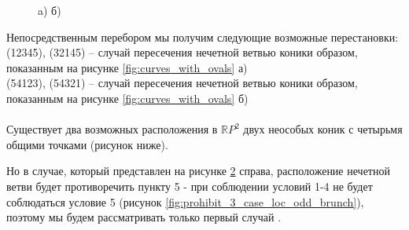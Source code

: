 \documentclass[11pt]{book}
\numberwithin{exercise}{chapter}
\begin{document}
\begin{figure}[H]
        \caption{a) б)}
    \label{fig:two_bad_ex}
\end{figure}

Непосредственным перебором мы получим следующие возможные перестановки:\\
(12345), (32145) – случай пересечения нечетной ветвью коники образом, показанным на рисунке \ref{fig:curves_with_ovals} а)\\ 
(54123), (54321) – случай пересечения нечетной ветвью коники образом, показанным на рисунке \ref{fig:curves_with_ovals} б)\\ 
\\
Существует два возможных расположения в $\mathbb RP^2$ двух неособых коник с четырьмя общими точками (рисунок ниже).
\\

\begin{figure}[H]
\caption{}
\label{fig:intersection_of_ovals}
\end{figure}

Но в случае, который представлен на рисунке \ref{fig:intersection_of_ovals} справа, расположение нечетной ветви будет противоречить пункту 5 - при соблюдении условий 1-4 не будет соблюдаться условие 5 (рисунок \ref{fig:prohibit_3_case_loc_odd_brunch}),  поэтому мы будем рассматривать только первый случай .
\end{document}
